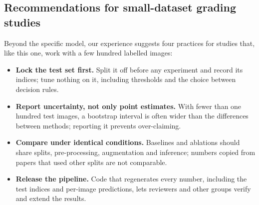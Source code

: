 \subsection{Recommendations for small-dataset grading studies}
Beyond the specific model, our experience suggests four practices for studies that, like this one, work with a few
hundred labelled images:
\begin{itemize}
\item \textbf{Lock the test set first.} Split it off before any experiment and record its indices; tune nothing on it,
  including thresholds and the choice between decision rules.
\item \textbf{Report uncertainty, not only point estimates.} With fewer than one hundred test images, a bootstrap
  interval is often wider than the differences between methods; reporting it prevents over-claiming.
\item \textbf{Compare under identical conditions.} Baselines and ablations should share splits, pre-processing,
  augmentation and inference; numbers copied from papers that used other splits are not comparable.
\item \textbf{Release the pipeline.} Code that regenerates every number, including the test indices and per-image
  predictions, lets reviewers and other groups verify and extend the results.
\end{itemize}
